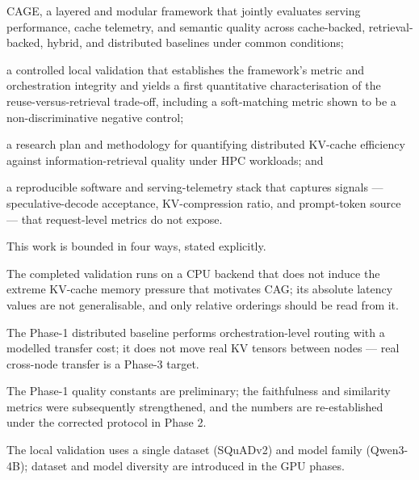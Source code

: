 \begin{compactitem}
  \item[a)] CAGE, a layered and modular framework that jointly evaluates serving performance, cache telemetry, and semantic quality across cache-backed, retrieval-backed, hybrid, and distributed baselines under common conditions;
  \item[b)] a controlled local validation that establishes the framework's metric and orchestration integrity and yields a first quantitative characterisation of the reuse-versus-retrieval trade-off, including a soft-matching metric shown to be a non-discriminative negative control;
  \item[c)] a research plan and methodology for quantifying distributed KV-cache efficiency against information-retrieval quality under HPC workloads; and
  \item[d)] a reproducible software and serving-telemetry stack that captures signals --- speculative-decode acceptance, KV-compression ratio, and prompt-token source --- that request-level metrics do not expose.
\end{compactitem}



This work is bounded in four ways, stated explicitly.

\begin{compactitem}
  \item[a)] The completed validation runs on a CPU backend that does not induce the extreme KV-cache memory pressure that motivates CAG; its absolute latency values are not generalisable, and only relative orderings should be read from it.
  \item[b)] The Phase-1 distributed baseline performs orchestration-level routing with a modelled transfer cost; it does not move real KV tensors between nodes --- real cross-node transfer is a Phase-3 target.
  \item[c)] The Phase-1 quality constants are preliminary; the faithfulness and similarity metrics were subsequently strengthened, and the numbers are re-established under the corrected protocol in Phase 2.
  \item[d)] The local validation uses a single dataset (SQuADv2) and model family (Qwen3-4B); dataset and model diversity are introduced in the GPU phases.
\end{compactitem}


